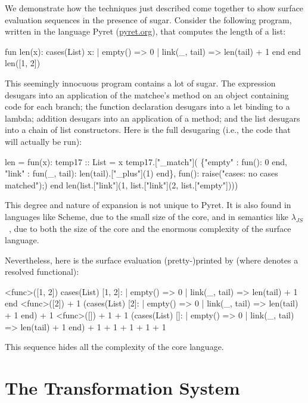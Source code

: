 We demonstrate how the techniques just described come together to show
surface evaluation sequences in the presence of sugar. Consider the
following program, written in the language Pyret (\url{pyret.org}), 
that computes the length of a list:
\begin{Codes}
    fun len(x):
      cases(List) x:
        | empty() => 0
        | link(_, tail) => len(tail) + 1
      end
    end
    len([1, 2])
\end{Codes}
This seemingly innocuous program contains a lot of sugar. The 
expression desugars into an application of the matchee's 
method on an object containing code for each branch; the function
declaration desugars into a let binding to a lambda; addition desugars
into an application of a  method; and the list \Code{[1, 2]}
desugars into a chain of list constructors. Here is the full desugaring
(i.e., the code that will actually be run):
\begin{Codes}
len = fun(x):
    temp17 :: List = x
    temp17.["_match"](
      \{"empty" : fun(): 0 end,
       "link" : fun(_, tail):
                len(tail).["_plus"](1) end\},
      fun(): raise("cases: no cases matched");)
    end
len(list.["link"](1, list.["link"](2, list.["empty"])))
\end{Codes}
This degree and nature of expansion is not unique to Pyret.
It is also found in languages like Scheme, due
to the small size of the core, and in semantics like
$\lambda_{JS}$~\cite{lambda-js},
due to both the size of the core and the enormous complexity
of the surface language.

Nevertheless, here is the surface evaluation (pretty-)printed by {\Resugarer} (where
 denotes a resolved functional):
\begin{Codes}
\SurfStep <func>([1, 2])
\SurfStep cases(List) [1, 2]:
      | empty() => 0
      | link(_, tail) => len(tail) + 1
    end
\SurfStep <func>([2]) + 1
\SurfStep (cases(List) [2]:
      | empty() => 0
      | link(_, tail) => len(tail) + 1
    end) + 1
\SurfStep <func>([]) + 1 + 1
\SurfStep (cases(List) []:
      | empty() => 0
      | link(_, tail) => len(tail) + 1
    end) + 1 + 1
 + 1 + 1
 + 1
\end{Codes}
This sequence hides all the complexity of the core language.


\section{The Transformation System}
\label{sec:reval-transformations}

